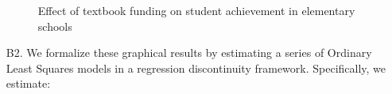 \documentclass[a4paper, 11pt]{article}
\begin{document}
\begin{enumerate}
\begin{figure} 
\begin{center}
\caption{Effect of textbook funding on student achievement in elementary schools}
\label{fig:outcome}
\end{center}
\end{figure}


	\item[B2.] We formalize these graphical results by estimating a series of Ordinary Least Squares models in a regression discontinuity framework. Specifically, we estimate:


\end{enumerate}
\end{document}
